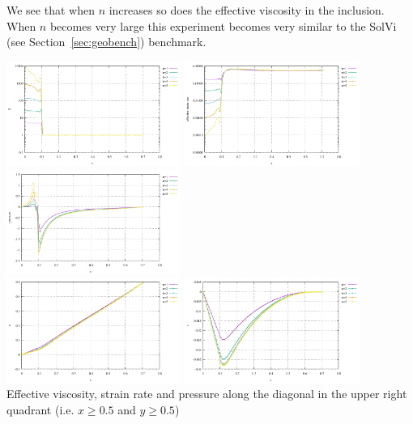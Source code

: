 We see that when $n$ increases so does the effective viscosity in the inclusion. When 
$n$ becomes very large this experiment becomes very similar to the SolVi (see 
Section~\ref{sec:geobench}) benchmark.

\begin{center}
\includegraphics[width=5.7cm]{python_codes/fieldstone_87/results/experiment_05/diag_eta}
\includegraphics[width=5.7cm]{python_codes/fieldstone_87/results/experiment_05/diag_sr}
\includegraphics[width=5.7cm]{python_codes/fieldstone_87/results/experiment_05/diag_p}\\
\includegraphics[width=5.7cm]{python_codes/fieldstone_87/results/experiment_05/diag_u}
\includegraphics[width=5.7cm]{python_codes/fieldstone_87/results/experiment_05/diag_v}\\
{\captionfont Effective viscosity, strain rate and pressure along the diagonal in the 
upper right quadrant (i.e. $x\ge 0.5$ and $y\ge 0.5$)}
\end{center}

